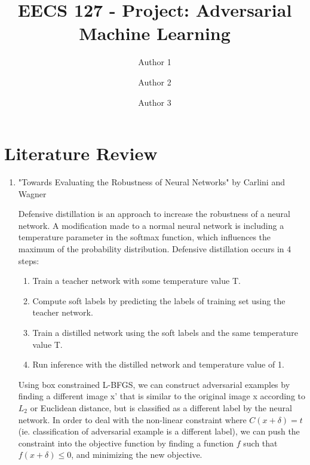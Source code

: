 \documentclass{amsart}
\title{EECS 127 - Project: Adversarial Machine Learning}  %
\author{Author 1}
\author{Author 2}  %
\author{Author 3}  %
\begin{document}
\maketitle

\tableofcontents

\pagebreak

\section{Literature Review}

\begin{enumerate}[label=(\alph*)]

    \item "Towards Evaluating the Robustness of Neural Networks" by Carlini and Wagner

    Defensive distillation is an approach to increase the robustness of a neural network. A modification
    made to a normal neural network is including a temperature parameter in the softmax function, which 
    influences the maximum of the probability distribution. Defensive distillation occurs in 4 steps: 

    \begin{enumerate}[label=\arabic*.]
        \item Train a teacher network with some temperature value T.

        \item Compute soft labels by predicting the labels of training set using the teacher network.

        \item Train a distilled network using the soft labels and the same temperature value T.

        \item Run inference with the distilled network and temperature value of 1.
    \end{enumerate}

    Using box constrained L-BFGS, we can construct adversarial examples by finding a different image 
    x' that is similar to the original image x according to $L_2$ or Euclidean distance, but is
    classified as a different label by the neural network. In order to deal with the non-linear
    constraint where $C(x + \delta) = t$ (ie. classification of adversarial example is a different
    label), we can push the constraint into the objective function by finding a function $f$
    such that $f(x + \delta) \le 0$, and minimizing the new objective. 


\end{enumerate}
\end{document}
